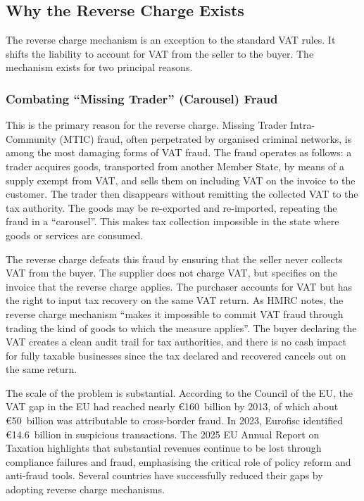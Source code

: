 \documentclass[11pt]{article}
\begin{document}
\subsection{Why the Reverse Charge Exists}

The reverse charge mechanism is an exception to the standard VAT rules. It shifts the liability to account for VAT from the seller to the buyer. The mechanism exists for two principal reasons.

\subsubsection{Combating ``Missing Trader'' (Carousel) Fraud}

This is the primary reason for the reverse charge. Missing Trader Intra-Community (MTIC) fraud, often perpetrated by organised criminal networks, is among the most damaging forms of VAT fraud. The fraud operates as follows: a trader acquires goods, transported from another Member State, by means of a supply exempt from VAT, and sells them on including VAT on the invoice to the customer. The trader then disappears without remitting the collected VAT to the tax authority. The goods may be re-exported and re-imported, repeating the fraud in a ``carousel''. This makes tax collection impossible in the state where goods or services are consumed.

The reverse charge defeats this fraud by ensuring that the seller never collects VAT from the buyer. The supplier does not charge VAT, but specifies on the invoice that the reverse charge applies. The purchaser accounts for VAT but has the right to input tax recovery on the same VAT return. As HMRC notes, the reverse charge mechanism ``makes it impossible to commit VAT fraud through trading the kind of goods to which the measure applies''. The buyer declaring the VAT creates a clean audit trail for tax authorities, and there is no cash impact for fully taxable businesses since the tax declared and recovered cancels out on the same return.

The scale of the problem is substantial. According to the Council of the EU, the VAT gap in the EU had reached nearly €160~billion by 2013, of which about €50~billion was attributable to cross-border fraud. In 2023, Eurofisc identified €14.6~billion in suspicious transactions. The 2025 EU Annual Report on Taxation highlights that substantial revenues continue to be lost through compliance failures and fraud, emphasising the critical role of policy reform and anti-fraud tools. Several countries have successfully reduced their gaps by adopting reverse charge mechanisms.
\end{document}
